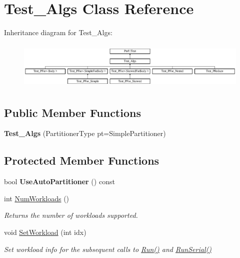 \hypertarget{classTest__Algs}{}\section{Test\+\_\+\+Algs Class Reference}
\label{classTest__Algs}
Inheritance diagram for Test\+\_\+\+Algs\+:\begin{figure}[H]
\begin{center}
\leavevmode
\includegraphics[height=2.297436cm]{classTest__Algs}
\end{center}
\end{figure}
\subsection*{Public Member Functions}
\begin{DoxyCompactItemize}
\item 
\hypertarget{classTest__Algs_ac2cd9b51c80c063731e3fa9b428cc03f}{}{\bfseries Test\+\_\+\+Algs} (Partitioner\+Type pt=Simple\+Partitioner)\label{classTest__Algs_ac2cd9b51c80c063731e3fa9b428cc03f}

\end{DoxyCompactItemize}
\subsection*{Protected Member Functions}
\begin{DoxyCompactItemize}
\item 
\hypertarget{classTest__Algs_ab52175b91adce716012f7b92be50a9e1}{}bool {\bfseries Use\+Auto\+Partitioner} () const \label{classTest__Algs_ab52175b91adce716012f7b92be50a9e1}

\item 
\hypertarget{classTest__Algs_a6c6af1aa5dc59c67b0598899e83156a5}{}int \hyperlink{classTest__Algs_a6c6af1aa5dc59c67b0598899e83156a5}{Num\+Workloads} ()\label{classTest__Algs_a6c6af1aa5dc59c67b0598899e83156a5}

\begin{DoxyCompactList}\small\item\em Returns the number of workloads supported. \end{DoxyCompactList}\item 
void \hyperlink{classTest__Algs_a18ccd1cedb43cdbb4fce546a1abba490}{Set\+Workload} (int idx)
\begin{DoxyCompactList}\small\item\em Set workload info for the subsequent calls to \hyperlink{classPerf_1_1Test_a64ad02d5651eb526f14e8d17df229cfb}{Run()} and \hyperlink{classPerf_1_1Test_aa36442055c9cd1267cbdf8a0bf431239}{Run\+Serial()} \end{DoxyCompactList}\end{DoxyCompactItemize}
